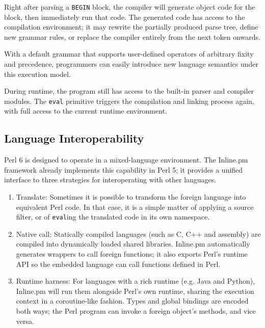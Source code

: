 \documentclass[]{sigplanconf}
\newcommand{\code}[1]{\texttt{#1}}
\begin{document}
Right after parsing a \code{BEGIN} block, the compiler will generate object
code for the block, then immediately run that code.  The generated code has
access to the compilation environment; it may rewrite the partially produced
parse tree, define new grammar rules, or replace the compiler entirely from the
next token onwards.

With a default grammar that supports user-defined operators of arbitrary fixity
and precedence, programmers can easily introduce new language semantics under
this execution model.

During runtime, the program still has access to the built-in parser and
compiler modules.  The \code{eval} primitive triggers the compilation and linking
process again, with full access to the current runtime environment.

\subsection{Language Interoperability}
\label{sec:LanguageInteroperability}

Perl 6 is designed to operate in a mixed-language environment. The Inline.pm
framework already implements this capability in Perl 5; it provides a unified
interface to three strategies for interoperating with other languages.

\begin{enumerate}
\item Translate:  Sometimes it is possible to transform the foreign language
into equivalent Perl code.  In that case, it is a simple matter of applying a
source filter, or of \code{eval}ing the translated code in its own namespace.

\item Native call:  Statically compiled languages (such as C, C++ and assembly)
are compiled into dynamically loaded shared libraries.  Inline.pm automatically
generates wrappers to call foreign functions; it also exports Perl's runtime
API so the embedded language can call functions defined in Perl.

\item Runtime harness:  For languages with a rich runtime (e.g. Java and Python),
Inline.pm will run them alongside Perl's own runtime, sharing the execution
context in a coroutine-like fashion.  Types and global bindings are encoded
both ways; the Perl program can invoke a foreign object's methods, and vice
versa.
\end{enumerate}
\end{document}
